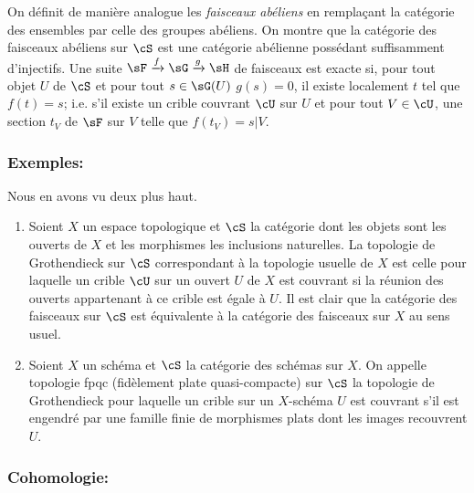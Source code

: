 On définit de manière analogue les \emph{faisceaux abéliens} en 
remplaçant la catégorie des ensembles par celle des groupes abéliens. On 
montre que la catégorie des faisceaux abéliens sur $\cS$ est une 
catégorie abélienne possédant suffisamment d'injectifs. Une suite 
$\sF\xrightarrow f \sG\xrightarrow g \sH$ de faisceaux est exacte si, pour 
tout objet $U$ de $\cS$ et pour tout $s\in \sG(U)$  $g(s)=0$, 
il existe localement $t$ tel que $f(t)=s$; i.e. s'il existe un crible couvrant 
$\cU$ sur $U$ et pour tout $V\in\cU$, une section $t_V$ de $\sF$ sur $V$ telle 
que $f(t_V)=s|V$. 





\subsubsection{Exemples:}\label{I:1-6-4}

Nous en avons vu deux plus haut. 

\begin{enumerate}[\indent a)]
  \item Soient $X$ un espace topologique et $\cS$ la catégorie dont les objets 
    sont les ouverts de $X$ et les morphismes les inclusions naturelles. La 
    topologie de Grothendieck sur $\cS$ correspondant à la topologie usuelle 
    de $X$ est celle pour laquelle un crible $\cU$ sur un ouvert $U$ de $X$ est 
    couvrant si la réunion des ouverts appartenant à ce crible est égale à 
    $U$. Il est clair que la catégorie des faisceaux sur $\cS$ est équivalente 
    à la catégorie des faisceaux sur $X$ au sens usuel. 
  \item Soient $X$ un schéma et $\cS$ la catégorie des schémas sur $X$. On 
    appelle topologie fpqc (fidèlement plate quasi-compacte) sur $\cS$ la 
    topologie de Grothendieck pour laquelle un crible sur un $X$-schéma $U$ est 
    couvrant s'il est engendré par une famille finie de morphismes plats dont  
    les images recouvrent $U$. 
\end{enumerate}





\subsubsection{Cohomologie:}\label{I:1-6-5}

